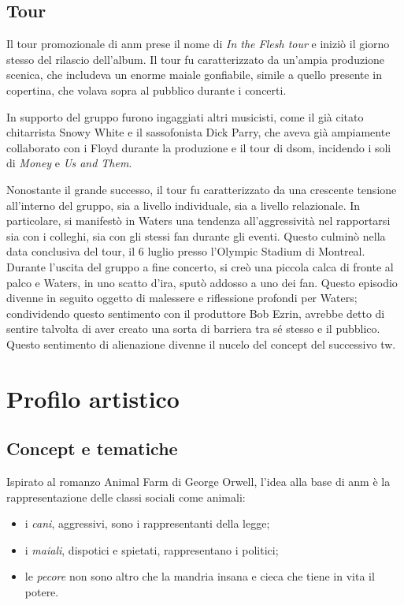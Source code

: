 \documentclass[class=book, crop=false, oneside, 12pt]{standalone}
\begin{document}
    \subsection{Tour}
    Il tour promozionale di \acrshort{anm} prese il nome di \emph{In the Flesh tour} e iniziò il giorno stesso del rilascio dell'album. Il tour fu caratterizzato da un'ampia produzione scenica, che includeva un enorme maiale gonfiabile, simile a quello presente in copertina, che volava sopra al pubblico durante i concerti. 

    In supporto del gruppo furono ingaggiati altri musicisti, come il già citato chitarrista Snowy White e il sassofonista Dick Parry, che aveva già ampiamente collaborato con i Floyd durante la produzione e il tour di \acrlong{dsom}, incidendo i soli di \emph{Money} e \emph{Us and Them}.

    Nonostante il grande successo, il tour fu caratterizzato da una crescente tensione all'interno del gruppo, sia a livello individuale, sia a livello relazionale. In particolare, si manifestò in Waters una tendenza all'aggressività nel rapportarsi sia con i colleghi, sia con gli stessi fan durante gli eventi. Questo culminò nella data conclusiva del tour, il 6 luglio presso l'Olympic Stadium di Montreal. Durante l'uscita del gruppo a fine concerto, si creò una piccola calca di fronte al palco  e Waters, in uno scatto d'ira, sputò addosso a uno dei fan. Questo episodio divenne in seguito oggetto di malessere e riflessione profondi per Waters; condividendo questo sentimento con il produttore Bob Ezrin, avrebbe detto di sentire talvolta di aver creato una sorta di barriera tra sé stesso e il pubblico. Questo sentimento di alienazione divenne il nucelo del concept del successivo \acrlong{tw}.
    
    \section{Profilo artistico}\label{sec:02-music}

    \subsection{Concept e tematiche}
    \label{subsec:animals-concept}
    Ispirato al romanzo Animal Farm di George Orwell, l'idea alla base di \acrshort{anm} è la rappresentazione delle classi sociali come  animali: 
    \begin{itemize}
        \item i \emph{cani}, aggressivi, sono i rappresentanti della legge;
        \item i \emph{maiali}, dispotici e spietati, rappresentano i politici;
        \item le \emph{pecore} non sono altro che la mandria insana e cieca che tiene in vita il potere.
    \end{itemize}
    
\end{document}
